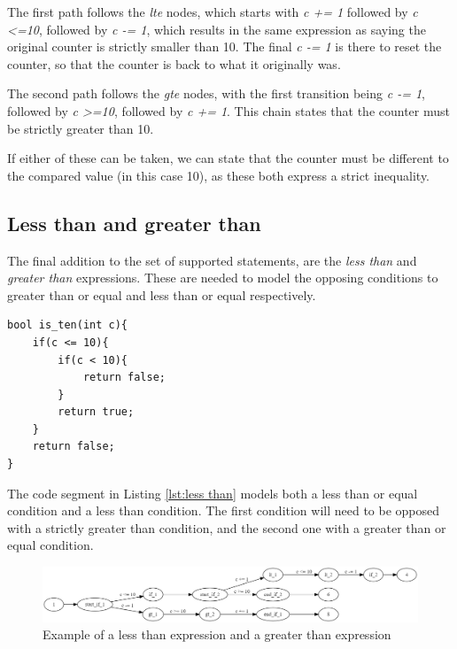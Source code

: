 \documentclass[12pt]{thesis}
\begin{document}
The first path follows the \textit{lte} nodes, which starts with \textit{c += 1} followed by \textit{c \textless =10}, followed by \textit{c -= 1}, which results in the same expression as saying the original counter is strictly smaller than 10. The final \textit{c -= 1} is there to reset the counter, so that the counter is back to what it originally was. 

The second path follows the \textit{gte} nodes, with the first transition being \textit{c -= 1}, followed by \textit{c \textgreater =10}, followed by \textit{c += 1}. This chain states that the counter must be strictly greater than 10.

If either of these can be taken, we can state that the counter must be different to the compared value (in this case 10), as these both express a strict inequality. 

\subsection{Less than and greater than}
\label{sec:strict}
The final addition to the set of supported statements, are the \textit{less than} and \textit{greater than} expressions. These are needed to model the opposing conditions to greater than or equal and less than or equal respectively.

\begin{lstlisting}[style=CStyle, caption={Example of a code segment using less than and less than or equal conditions}, label={lst:less than}]
bool is_ten(int c){
	if(c <= 10){
		if(c < 10){
			return false;
		}
		return true;
	}
	return false;
}
\end{lstlisting}

The code segment in Listing \ref{lst:less than} models both a less than or equal condition and a less than condition. The first condition will need to be opposed with a strictly greater than condition, and the second one with a greater than or equal condition.

\begin{figure}[h]
	\centering
	\includegraphics[width=\linewidth]{less_than_greater_than}
	\caption{Example of a less than expression and a greater than expression}
	\label{fig:less_than_greater_than}
\end{figure}
\end{document}
